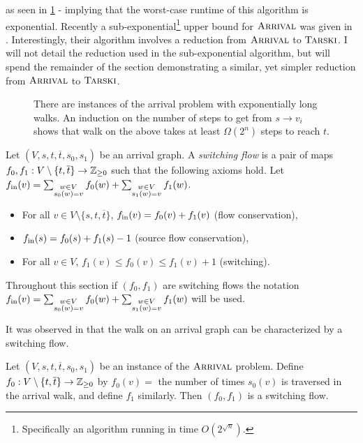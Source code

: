 as seen in \cref{expLongArrival} - implying that the worst-case runtime of this algorithm is exponential.
Recently a sub-exponential\footnote{Specifically an algorithm running
in time $O(2^{\sqrt{n}})$.} upper bound for $\textsc{Arrival}$ was given in \citep{gärtner2021subexponential}.
Interestingly, their algorithm involves a reduction from $\textsc{Arrival}$ to $\textsc{Tarski}$. I will not detail
the reduction used in the sub-exponential algorithm, but will spend the remainder of the section
demonstrating a similar, yet simpler reduction from $\textsc{Arrival}$ to $\textsc{Tarski}$.
\begin{figure}[h]
  \centering
  
  \caption{There are instances of the arrival problem with exponentially long walks. An induction
  on the number of steps to get from $s \to v_i$ shows that walk on the above
  takes at least $\Omega(2^n)$ steps to reach $t$.}\label{expLongArrival}
\end{figure}
\begin{definition}
  Let $(V, s, t, \overline{t}, s_0, s_1)$ be an arrival graph. A \emph{switching flow} is a pair of maps 
  $f_0, f_1 : V \setminus \{t, \overline{t}\} \to \mathbb{Z}_{\geq 0}$ such that the following axioms hold.
    Let $f_{\text{in}}(v) =
        \sum_{\substack{w \in V \\ s_0(w) = v}} f_0(w) 
        + \sum_{\substack{w \in V \\ s_1(w) = v}} f_1(w)$. 
  \begin{itemize}
    \item For all $v \in V \setminus \{s, t, \overline{t}\}$, $f_{\text{in}}(v) = f_0(v) + f_1(v)$ (flow conservation),
    \item $f_{\text{in}}(s) = f_0(s) + f_1(s) - 1$ (source flow conservation),
    \item For all $v \in V$, $f_1(v) \leq f_0(v) \leq f_1(v) + 1$ (switching).
  \end{itemize}
\end{definition}
\begin{notation}
    Throughout this section if $(f_0, f_1)$ are switching flows the notation $f_{\text{in}}(v) =
        \sum_{\substack{w \in V \\ s_0(w) = v}} f_0(w) 
        + \sum_{\substack{w \in V \\ s_1(w) = v}} f_1(w)$ will be used. 
\end{notation}
  It was observed in \citep{arrivalBasic} that the walk on an arrival graph can be characterized
  by a switching flow.
  \begin{lemma}\label{walkSwitching}
    Let $(V, s, t, \overline{t}, s_0, s_1)$ be an instance of the $\textsc{Arrival}$ problem. Define
    $f_0 : V \setminus \{t, \overline{t}\} \to \mathbb{Z}_{\geq 0}$ by $f_0(v) =$ the number of times $s_0(v)$
    is traversed in the arrival walk, and define $f_1$ similarly. Then $(f_0, f_1)$ is a switching
    flow.
  \end{lemma}
